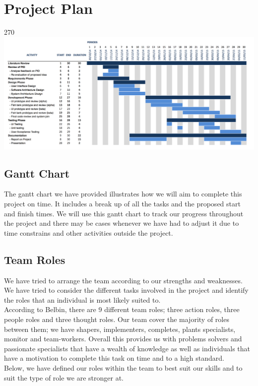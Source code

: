 \section{Project Plan}

\begin{minipage}{\linewidth}
  \hspace*{1.7in}
  \begin{rotate}{270}
    \includegraphics[width=1.28\textwidth]{./img/gantt_chart.png}
    \label{gantt_chart}
  \end{rotate}
\end{minipage}
\clearpage

\subsection{Gantt Chart}
The gantt chart we have provided illustrates how we will aim to complete this project on time.  It includes a break up of all the tasks and the proposed start and finish times.  We will use this gantt chart to track our progress throughout the project and there may be cases whenever we have had to adjust it due to time constrains and other activities outside the project.  

\subsection{Team Roles}
We have tried to arrange the team according to our strengths and weaknesses.  We have tried to consider the different tasks involved in the project and identify the roles that an individual is most likely suited to.  \\
According to Belbin, there are 9 different team roles; three action roles, three people roles and three thought roles.  Our team cover the majority of roles between them; we have shapers, implementers, completes, plants specialists, monitor and team-workers.  Overall this provides us with problems solvers and passionate specialists that have a wealth of knowledge as well as individuals that have a  motivation to complete this task on time and to a high standard. \\
Below, we have defined our roles within the team to best suit our skills and to suit the type of role we are stronger at.

